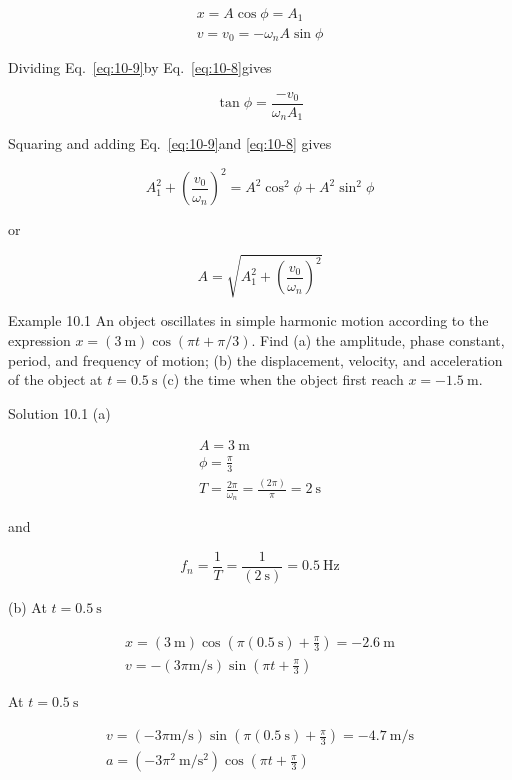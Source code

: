 \documentclass[10pt]{article}
\numberwithin{equation}{section}
\begin{document}
\begin{gather}
x=A \cos \phi=A_{1}  \label{eq:10-8}\\
v=v_{0}=-\omega_{n} A \sin \phi \label{eq:10-9}
\end{gather}


Dividing Eq.~\eqref{eq:10-9}by Eq.~\eqref{eq:10-8}gives

$$
\tan \phi=\frac{-v_{0}}{\omega_{n} A_{1}}
$$

Squaring and adding Eq.~\eqref{eq:10-9}and \eqref{eq:10-8} gives

$$
A_{1}^{2}+\left(\frac{v_{0}}{\omega_{n}}\right)^{2}=A^{2} \cos ^{2} \phi+A^{2} \sin ^{2} \phi
$$

or

$$
A=\sqrt{A_{1}^{2}+\left(\frac{v_{0}}{\omega_{n}}\right)^{2}}
$$

Example 10.1 An object oscillates in simple harmonic motion according to the expression $x=(3 \mathrm{~m}) \cos (\pi t+\pi / 3)$. Find (a) the amplitude, phase constant, period, and frequency of motion; (b) the displacement, velocity, and acceleration of the object at $t=0.5 \mathrm{~s}$ (c) the time when the object first reach $x=-1.5 \mathrm{~m}$.

Solution 10.1 (a)

$$
\begin{gathered}
A=3 \mathrm{~m} \\
\phi=\frac{\pi}{3} \\
T=\frac{2 \pi}{\omega_{n}}=\frac{(2 \pi)}{\pi}=2 \mathrm{~s}
\end{gathered}
$$

and

$$
f_{n}=\frac{1}{T}=\frac{1}{(2 \mathrm{~s})}=0.5 \mathrm{~Hz}
$$

(b) At $t=0.5 \mathrm{~s}$

$$
\begin{gathered}
x=(3 \mathrm{~m}) \cos \left(\pi(0.5 \mathrm{~s})+\frac{\pi}{3}\right)=-2.6 \mathrm{~m} \\
v=-(3 \pi \mathrm{m} / \mathrm{s}) \sin \left(\pi t+\frac{\pi}{3}\right)
\end{gathered}
$$

At $t=0.5 \mathrm{~s}$

$$
\begin{gathered}
v=(-3 \pi \mathrm{m} / \mathrm{s}) \sin \left(\pi(0.5 \mathrm{~s})+\frac{\pi}{3}\right)=-4.7 \mathrm{~m} / \mathrm{s} \\
a=\left(-3 \pi^{2} \mathrm{~m} / \mathrm{s}^{2}\right) \cos \left(\pi t+\frac{\pi}{3}\right)
\end{gathered}
$$
\end{document}
